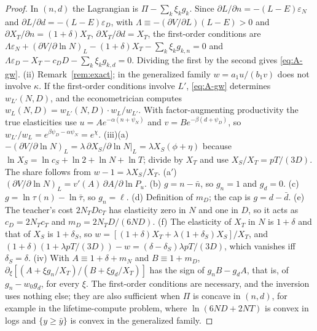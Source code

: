 \begin{proof}
In $(n,d)$ the Lagrangian is $\Pi-\sum_k\xi_kg_k$. Since $\partial L/\partial n=-(L-E)\varepsilon_N$ and
$\partial L/\partial d=-(L-E)\varepsilon_D$, with $\Lambda\equiv-(\partial V/\partial L)(L-E)>0$ and
$\partial X_T/\partial n=(1+\delta)X_T$, $\partial X_T/\partial d=X_T$, the first-order conditions are
$\Lambda\varepsilon_N+(\partial V/\partial\ln N)_L-(1+\delta)X_T-\sum_k\xi_kg_{k,n}=0$ and
$\Lambda\varepsilon_D-X_T-c_DD-\sum_k\xi_kg_{k,d}=0$. Dividing the first by the second gives \eqref{eq:A-gw}.
(ii) Remark~\ref{rem:exact}; in the generalized family $w=a_1u/(b_1v)$ does not involve $\kappa$. If the first-order
conditions involve $L'$, \eqref{eq:A-gw} determines $w_{L'}(N,D)$, and the econometrician computes
$w_L(N,D)=w_{L'}(N,D)\cdot w_L/w_{L'}$. With factor-augmenting productivity the true elasticities use
$u=Ae^{-\alpha(n+\psi_N)}$ and $v=Be^{-\beta(d+\psi_D)}$, so $w_{L'}/w_L=e^{\beta\psi_D-\alpha\psi_N}=e^{\chi}$.
(iii)(a) $-(\partial V/\partial\ln N)_L=\lambda\,\partial X_S/\partial\ln N|_L=\lambda X_S(\phi+\eta)$ because
$\ln X_S=\ln c_S+\ln2+\ln N+\ln T$; divide by $X_T$ and use $X_S/X_T=pT/(3D)$. The share follows from $w-1=\lambda X_S/X_T$.
(a$'$) $(\partial V/\partial\ln N)_L=v'(A)\,\partial A/\partial\ln P_u$. (b) $g=n-\bar n$, so $g_n=1$ and $g_d=0$.
(c) $g=\ln\tau(n)-\ln\bar\tau$, so $g_n=\ell$. (d) Definition of $m_D$; the cap is $g=d-\bar d$. (e) The teacher's cost
$2N_TDc_T$ has elasticity zero in $N$ and one in $D$, so it acts as $c_D=2N_Tc_T$ and $m_D=2N_TD/(6ND)$. (f) The elasticity
of $X_T$ in $N$ is $1+\delta$ and that of $X_S$ is $1+\delta_S$, so $w=[(1+\delta)X_T+\lambda(1+\delta_S)X_S]/X_T$, and
$(1+\delta)(1+\lambda pT/(3D))-w=(\delta-\delta_S)\lambda pT/(3D)$, which vanishes iff $\delta_S=\delta$.
(iv) With $A\equiv1+\delta+m_N$ and $B\equiv1+m_D$, $\partial_\xi[(A+\xi g_n/X_T)/(B+\xi g_d/X_T)]$ has the sign of
$g_nB-g_dA$, that is, of $g_n-w_0g_d$, for every $\xi$. The first-order conditions are
necessary, and the inversion uses nothing else; they are also sufficient when $\Pi$ is concave in $(n,d)$, for example in
the lifetime-compute problem, where $\ln(6ND+2NT)$ is convex in logs and $\{y\ge\bar y\}$ is convex in the generalized
family.
\end{proof}

